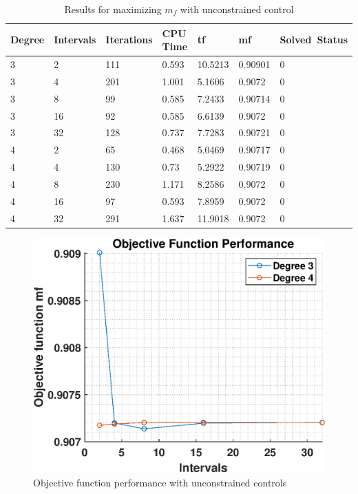 \documentclass[]{article}
\begin{document}
	\begin{table}[h!]
		\begin{tabular}{lllllll}
			Degree & Intervals & Iterations & CPU Time & tf & mf & Solved\ Status \\ 
			\hline 
			3 & 2 & 111 & 0.593 & 10.5213 & 0.90901 & 0 \\ 
			3 & 4 & 201 & 1.001 & 5.1606 & 0.9072 & 0 \\ 
			3 & 8 & 99 & 0.585 & 7.2433 & 0.90714 & 0 \\ 
			3 & 16 & 92 & 0.585 & 6.6139 & 0.9072 & 0 \\ 
			3 & 32 & 128 & 0.737 & 7.7283 & 0.90721 & 0 \\ 
			4 & 2 & 65 & 0.468 & 5.0469 & 0.90717 & 0 \\ 
			4 & 4 & 130 & 0.73 & 5.2922 & 0.90719 & 0 \\ 
			4 & 8 & 230 & 1.171 & 8.2586 & 0.9072 & 0 \\ 
			4 & 16 & 97 & 0.593 & 7.8959 & 0.9072 & 0 \\ 
			4 & 32 & 291 & 1.637 & 11.9018 & 0.9072 & 0 \\ 
			\hline 
		\end{tabular}
		\caption{Results for maximizing \(m_f\) with unconstrained control}
		\label{table:2}
	\end{table}
	\FloatBarrier
	\begin{figure}
		\centering
		\includegraphics[scale=0.75]{obj_c2_mf.eps}
		\caption{Objective function performance with unconstrained controls}
		\label{fig:obj_c2_mf}
	\end{figure}
\end{document}
